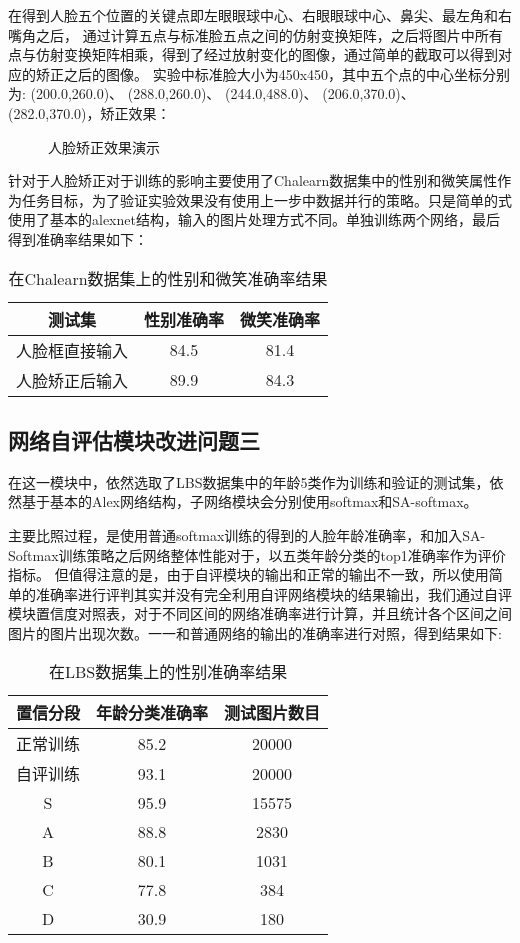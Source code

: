 在得到人脸五个位置的关键点即左眼眼球中心、右眼眼球中心、鼻尖、最左角和右嘴角之后，
通过计算五点与标准脸五点之间的仿射变换矩阵，之后将图片中所有点与仿射变换矩阵相乘，得到了经过放射变化的图像，通过简单的截取可以得到对应的矫正之后的图像。
实验中标准脸大小为450x450，其中五个点的中心坐标分别为:
(200.0,260.0)、 (288.0,260.0)、 (244.0,488.0)、 (206.0,370.0)、 (282.0,370.0)，矫正效果：
\begin{figure}[!h]
 \centering
	\caption{人脸矫正效果演示}
\end{figure}

针对于人脸矫正对于训练的影响主要使用了Chalearn数据集中的性别和微笑属性作为任务目标，为了验证实验效果没有使用上一步中数据并行的策略。只是简单的式使用了基本的alexnet结构，输入的图片处理方式不同。单独训练两个网络，最后得到准确率结果如下：
\begin{table}[!h]
  \centering
   \caption{在Chalearn数据集上的性别和微笑准确率结果}
   \begin{tabular}{c|c|c}
     \toprule
     测试集&性别准确率&微笑准确率\\
     \midrule
     人脸框直接输入  & 84.5 & 81.4 \\
	 人脸矫正后输入  & 89.9 & 84.3 \\
     \bottomrule
   \end{tabular}
\end{table}
\subsection{网络自评估模块改进问题三}
在这一模块中，依然选取了LBS数据集中的年龄5类作为训练和验证的测试集，依然基于基本的Alex网络结构，子网络模块会分别使用softmax和SA-softmax。

主要比照过程，是使用普通softmax训练的得到的人脸年龄准确率，和加入SA-Softmax训练策略之后网络整体性能对于，以五类年龄分类的top1准确率作为评价指标。
但值得注意的是，由于自评模块的输出和正常的输出不一致，所以使用简单的准确率进行评判其实并没有完全利用自评网络模块的结果输出，我们通过自评模块置信度对照表，对于不同区间的网络准确率进行计算，并且统计各个区间之间图片的图片出现次数。一一和普通网络的输出的准确率进行对照，得到结果如下:
\begin{table}[!h]
  \centering
   \caption{在LBS数据集上的性别准确率结果}
   \begin{tabular}{c|c|c}
     \toprule
     置信分段&年龄分类准确率&测试图片数目\\
     \midrule
      正常训练 &  85.2 & 20000 \\
	  自评训练 &  93.1 & 20000 \\	  
      S        &  95.9 & 15575 \\
	  A        &  88.8 & 2830 \\
	  B        &  80.1 & 1031 \\
	  C        &  77.8 & 384  \\
	  D        &  30.9 & 180  \\
     \bottomrule
   \end{tabular}
\end{table}

